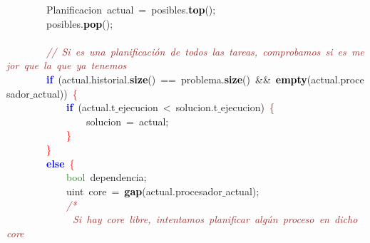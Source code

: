 \mbox{}\ \ \ \ \ \ \ \ \textcolor{TealBlue}{Planificacion}\ actual\ \textcolor{BrickRed}{=}\ posibles\textcolor{BrickRed}{.}\textbf{\textcolor{Black}{top}}\textcolor{BrickRed}{();} \\
\mbox{}\ \ \ \ \ \ \ \ posibles\textcolor{BrickRed}{.}\textbf{\textcolor{Black}{pop}}\textcolor{BrickRed}{();} \\
\mbox{} \\
\mbox{}\ \ \ \ \ \ \ \ \textit{\textcolor{Brown}{//\ Si\ es\ una\ planificación\ de\ todos\ las\ tareas,\ comprobamos\ si\ es\ mejor\ que\ la\ que\ ya\ tenemos}} \\
\mbox{}\ \ \ \ \ \ \ \ \textbf{\textcolor{Blue}{if}}\ \textcolor{BrickRed}{(}actual\textcolor{BrickRed}{.}historial\textcolor{BrickRed}{.}\textbf{\textcolor{Black}{size}}\textcolor{BrickRed}{()}\ \textcolor{BrickRed}{==}\ problema\textcolor{BrickRed}{.}\textbf{\textcolor{Black}{size}}\textcolor{BrickRed}{()}\ \textcolor{BrickRed}{\&\&}\ \textbf{\textcolor{Black}{empty}}\textcolor{BrickRed}{(}actual\textcolor{BrickRed}{.}procesador$\_$actual\textcolor{BrickRed}{))}\ \textcolor{Red}{\{} \\
\mbox{}\ \ \ \ \ \ \ \ \ \ \ \ \textbf{\textcolor{Blue}{if}}\ \textcolor{BrickRed}{(}actual\textcolor{BrickRed}{.}t$\_$ejecucion\ \textcolor{BrickRed}{\textless{}}\ solucion\textcolor{BrickRed}{.}t$\_$ejecucion\textcolor{BrickRed}{)}\ \textcolor{Red}{\{} \\
\mbox{}\ \ \ \ \ \ \ \ \ \ \ \ \ \ \ \ solucion\ \textcolor{BrickRed}{=}\ actual\textcolor{BrickRed}{;} \\
\mbox{}\ \ \ \ \ \ \ \ \ \ \ \ \textcolor{Red}{\}} \\
\mbox{}\ \ \ \ \ \ \ \ \textcolor{Red}{\}} \\
\mbox{}\ \ \ \ \ \ \ \ \textbf{\textcolor{Blue}{else}}\ \textcolor{Red}{\{} \\
\mbox{}\ \ \ \ \ \ \ \ \ \ \ \ \textcolor{ForestGreen}{bool}\ dependencia\textcolor{BrickRed}{;} \\
\mbox{}\ \ \ \ \ \ \ \ \ \ \ \ \textcolor{TealBlue}{uint}\ core\ \textcolor{BrickRed}{=}\ \textbf{\textcolor{Black}{gap}}\textcolor{BrickRed}{(}actual\textcolor{BrickRed}{.}procesador$\_$actual\textcolor{BrickRed}{);} \\
\mbox{}\ \ \ \ \ \ \ \ \ \ \ \ \textit{\textcolor{Brown}{/*}} \\
\mbox{}\textit{\textcolor{Brown}{\ \ \ \ \ \ \ \ \ \ \ \ \ Si\ hay\ core\ libre,\ intentamos\ planificar\ algún\ proceso\ en\ dicho\ core}} \\
